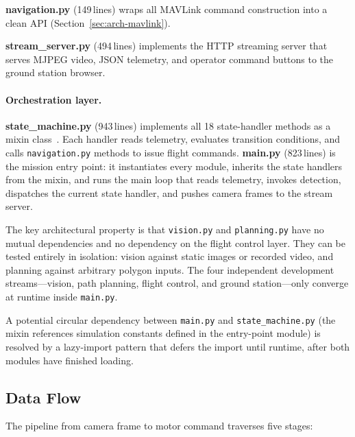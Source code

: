 \textbf{navigation.py} (149\,lines) wraps all MAVLink command construction into a clean API (Section~\ref{sec:arch-mavlink}).

\textbf{stream\_server.py} (494\,lines) implements the HTTP streaming server that serves MJPEG video, JSON telemetry, and operator command buttons to the ground station browser.

\paragraph{Orchestration layer.}
\textbf{state\_machine.py} (943\,lines) implements all 18 state-handler methods as a mixin class~\cite{fsm}. Each handler reads telemetry, evaluates transition conditions, and calls \texttt{navigation.py} methods to issue flight commands. \textbf{main.py} (823\,lines) is the mission entry point: it instantiates every module, inherits the state handlers from the mixin, and runs the main loop that reads telemetry, invokes detection, dispatches the current state handler, and pushes camera frames to the stream server.

The key architectural property is that \texttt{vision.py} and \texttt{planning.py} have no mutual dependencies and no dependency on the flight control layer. They can be tested entirely in isolation: vision against static images or recorded video, and planning against arbitrary polygon inputs. The four independent development streams---vision, path planning, flight control, and ground station---only converge at runtime inside \texttt{main.py}.

A potential circular dependency between \texttt{main.py} and \texttt{state\_machine.py} (the mixin references simulation constants defined in the entry-point module) is resolved by a lazy-import pattern that defers the import until runtime, after both modules have finished loading.

\subsection{Data Flow}\label{sec:arch-dataflow}

The pipeline from camera frame to motor command traverses five stages:

